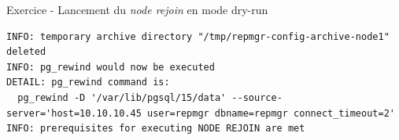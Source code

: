 \begin{frame}[fragile]{Exercice - Lancement du \textit{node rejoin} en mode dry-run}
\begin{itemize}
\begin{tiny}
\begin{Verbatim}[commandchars=\&\{\}]
INFO: temporary archive directory "/tmp/repmgr-config-archive-node1" deleted                                                                                                                  
INFO: pg_rewind would now be executed                                                                                                                                                         
DETAIL: pg_rewind command is:                                                                                                                                                                 
  pg_rewind -D '/var/lib/pgsql/15/data' --source-server='host=10.10.10.45 user=repmgr dbname=repmgr connect_timeout=2'                                                                        
INFO: prerequisites for executing NODE REJOIN are met
\end{Verbatim}
\end{tiny}
   \end{itemize}

\end{frame}


